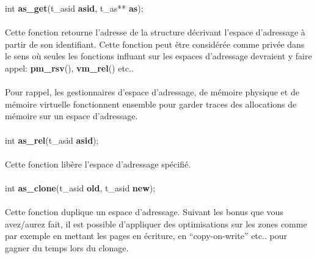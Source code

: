 \documentclass[10pt,a4wide]{article}
\begin{document}
\hspace{1.5cm}int \textbf{as\_get}(t\_asid \textbf{asid},
                                   t\_as** \textbf{as});

\paragraph{}

Cette fonction retourne l'adresse de la structure d\'ecrivant l'espace
d'adressage \`a partir de son identifiant. Cette fonction peut \^etre
consid\'er\'ee comme priv\'ee dans le sens o\`u seules les fonctions
influant sur les espaces d'adressage devraient y faire appel:
\textbf{pm\_rsv}(), \textbf{vm\_rel}() etc..

\paragraph{}

Pour rappel, les gestionnaires d'espace d'adressage, de m\'emoire physique
et de m\'emoire virtuelle fonctionnent ensemble pour garder traces des
allocations de m\'emoire sur un espace d'adressage.

\paragraph{}

\hspace{1.5cm}int \textbf{as\_rel}(t\_asid \textbf{asid});

\paragraph{}

Cette fonction lib\`ere l'espace d'adressage sp\'ecifi\'e.

\paragraph{}

\hspace{1.5cm}int \textbf{as\_clone}(t\_asid \textbf{old},
                                     t\_asid \textbf{new});

\paragraph{}

Cette fonction duplique un espace d'adressage. Suivant les bonus que vous
avez/aurez fait, il est possible d'appliquer des optimisations sur les zones
comme par exemple en mettant les pages en \'ecriture, en ``copy-on-write''
etc.. pour gagner du temps lors du clonage.
\end{document}
